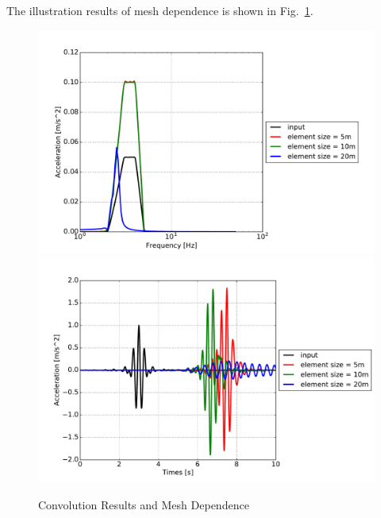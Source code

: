 The illustration results of mesh dependence is shown in Fig.~\ref{fig_day2_convolution_time_freq}.

\begin{figure}[H]
  \centering
  \includegraphics[width = 12cm]{./Figure-files/Day2/Convolution_Motions/top_acc_feq_all.pdf}
  \includegraphics[width = 12cm]{./Figure-files/Day2/Convolution_Motions/top_acc_time_all.pdf}
  \caption{Convolution Results and Mesh Dependence}
  \label{fig_day2_convolution_time_freq}
\end{figure}



































